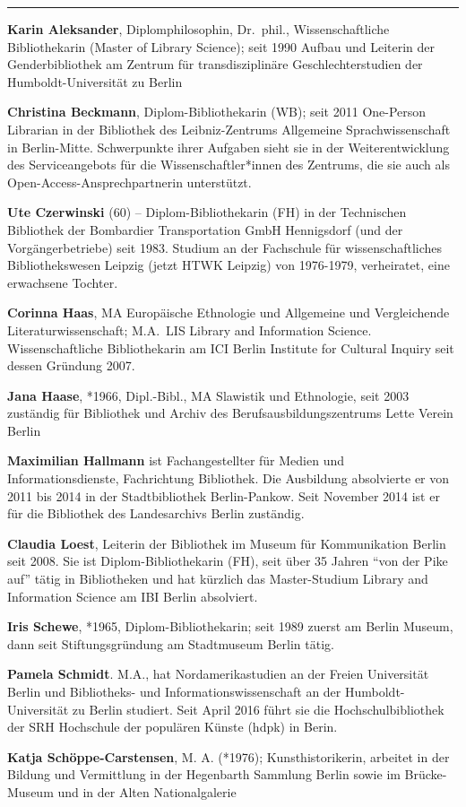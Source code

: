 \begin{center}\rule{0.5\linewidth}{\linethickness}\end{center}

\textbf{Karin Aleksander}, Diplomphilosophin, Dr.~phil.,
Wissenschaftliche Bibliothekarin (Master of Library Science); seit 1990
Aufbau und Leiterin der Genderbibliothek am Zentrum für
transdisziplinäre Geschlechterstudien der Humboldt-Universität zu Berlin

\textbf{Christina Beckmann}, Diplom-Bibliothekarin (WB); seit 2011
One-Person Librarian in der Bibliothek des Leibniz-Zentrums Allgemeine
Sprachwissenschaft in Berlin-Mitte. Schwerpunkte ihrer Aufgaben sieht
sie in der Weiterentwicklung des Serviceangebots für die
Wissenschaftler*innen des Zentrums, die sie auch als
Open-Access-Ansprechpartnerin unterstützt.

\textbf{Ute Czerwinski} (60) -- Diplom-Bibliothekarin (FH) in der
Technischen Bibliothek der Bombardier Transportation GmbH Hennigsdorf
(und der Vorgängerbetriebe) seit 1983. Studium an der Fachschule für
wissenschaftliches Bibliothekswesen Leipzig (jetzt HTWK Leipzig) von
1976-1979, verheiratet, eine erwachsene Tochter.

\textbf{Corinna Haas}, MA Europäische Ethnologie und Allgemeine und
Vergleichende Literaturwissenschaft; M.A.~LIS Library and Information
Science. Wissenschaftliche Bibliothekarin am ICI Berlin Institute for
Cultural Inquiry seit dessen Gründung 2007.

\textbf{Jana Haase}, *1966, Dipl.-Bibl., MA Slawistik und Ethnologie,
seit 2003 zuständig für Bibliothek und Archiv des
Berufsausbildungszentrums Lette Verein Berlin

\textbf{Maximilian Hallmann} ist Fachangestellter für Medien und
Informationsdienste, Fachrichtung Bibliothek. Die Ausbildung absolvierte
er von 2011 bis 2014 in der Stadtbibliothek Berlin-Pankow. Seit November
2014 ist er für die Bibliothek des Landesarchivs Berlin zuständig.

\textbf{Claudia Loest}, Leiterin der Bibliothek im Museum für
Kommunikation Berlin seit 2008. Sie ist Diplom-Bibliothekarin (FH), seit
über 35 Jahren ``von der Pike auf'' tätig in Bibliotheken und hat
kürzlich das Master-Studium Library and Information Science am IBI
Berlin absolviert.

\textbf{Iris Schewe}, *1965, Diplom-Bibliothekarin; seit 1989 zuerst am
Berlin Museum, dann seit Stiftungsgründung am Stadtmuseum Berlin tätig.

\textbf{Pamela Schmidt}. M.A., hat Nordamerikastudien an der Freien
Universität Berlin und Bibliotheks- und Informationswissenschaft an der
Humboldt-Universität zu Berlin studiert. Seit April 2016 führt sie die
Hochschulbibliothek der SRH Hochschule der populären Künste (hdpk) in
Berin.

\textbf{Katja Schöppe-Carstensen}, M. A. (*1976); Kunsthistorikerin,
arbeitet in der Bildung und Vermittlung in der Hegenbarth Sammlung
Berlin sowie im Brücke-Museum und in der Alten Nationalgalerie
